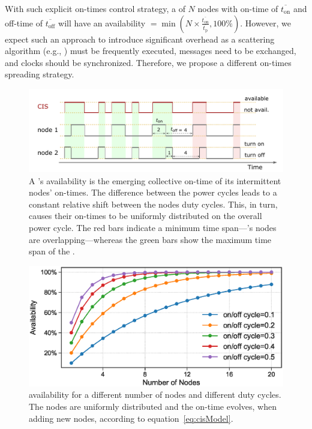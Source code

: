 With such explicit on-times control strategy, a \cis of $N$ nodes with on-time of $\overline{t_\text{on}}$ and off-time of $\overline{t_\text{off}}$ will have an availability 
$= \min \left(N\times \frac{\overline{t_\text{on}}}{\overline{t_\text{p}}}, 100\%\right)$. However, we expect such an approach to introduce significant overhead as a scattering algorithm (e.g., \cite{giusti2007decentralized}) must be frequently executed, messages need to be exchanged, and clocks should be synchronized. Therefore, we propose a different on-times spreading strategy.  
%
\begin{figure}[t]
		\centering
		\includegraphics[width=\columnwidth]{figures/cisOntime}
		\caption{A \fullcis's availability is the emerging collective on-time of its intermittent nodes' on-times. The difference between the power cycles leads to a constant relative shift between the nodes duty cycles. This, in turn, causes their on-times to be uniformly distributed on the overall power cycle. The red bars indicate a minimum \cis time span---\cis's nodes are overlapping---whereas the green bars show the maximum time span of the \cis.}
		\label{fig:cisOntime}
\end{figure} 
%
\begin{figure}
		\centering
		\includegraphics[width=\columnwidth]{figures/cisModel}
		\caption{\fullcis availability for a different number of nodes and different duty cycles. The nodes are uniformly distributed and the \cis on-time evolves, when adding new nodes, according to equation~\ref{eq:cisModel}.}
		\label{fig:cisModel}
\end{figure} 
%
